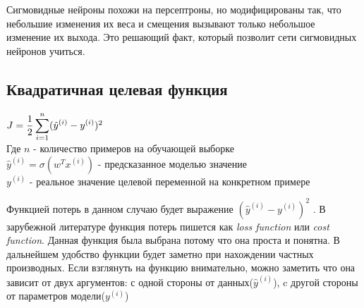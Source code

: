 Сигмовидные нейроны похожи на персептроны, но модифицированы так, что небольшие изменения их веса и смещения вызывают только небольшое изменение их выхода. Это решающий факт, который позволит сети сигмовидных нейронов учиться.

\subsection{Квадратичная целевая функция}

$ \mathlarger{ J = \frac{1}{2} \sum_{i=1}^{n} (\hat{y}^{(i)} - y^{(i)}})^2 $ \\
Где $n$ - количество примеров на обучающей выборке \\
$\hat{y}^{(i)} = \sigma (w^T x^{(i)})$ - предсказанное моделью значение \\
$y^{(i)}$ - реальное значение целевой переменной на конкретном примере

Функцией потерь в данном случаю будет выражение $(\hat{y}^{(i)} - y^{(i)})^2$ . В зарубежной литературе функция потерь пишется как \textit{loss function} или \textit{cost function}.
Данная функция была выбрана потому что она проста и понятна. В дальнейшем удобство функции будет заметно при нахождении частных производных. Если взглянуть на функцию внимательно, можно заметить что она зависит от двух аргументов: с одной стороны от данных($\hat{y}^{(i)}$), c другой стороны от параметров модели($y^{(i)}$)